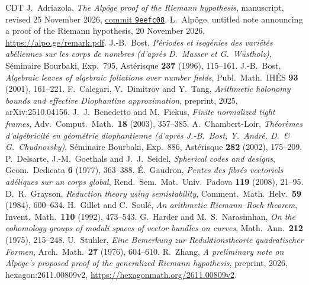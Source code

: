 \documentclass[reqno]{amsart}
\theoremstyle{definition}
\theoremstyle{plain}
\begin{document}
\begin{thebibliography}{CDT}
 J.~Adriazola, \emph{The Alp\"oge proof of the Riemann hypothesis}, manuscript, revised 25 November 2026, \href{https://github.com/jimjamzola/RH-Alpoge-Reconstruction/tree/9eefc08b0819728d4dd2ef0568b49a61251af111}{commit \texttt{9eefc08}}.
 L.~Alp\"oge, untitled note announcing a proof of the Riemann hypothesis, 20 November 2026, \url{https://alpo.ge/remark.pdf}.
 J.-B.~Bost, \emph{P\'eriodes et isog\'enies des vari\'et\'es ab\'eliennes sur les corps de nombres (d'apr\`es D.~Masser et G.~W\"ustholz)}, S\'eminaire Bourbaki, Exp.~795, Ast\'erisque \textbf{237} (1996), 115--161.
 J.-B.~Bost, \emph{Algebraic leaves of algebraic foliations over number fields}, Publ.\ Math.\ IH\'ES \textbf{93} (2001), 161--221.
 F.~Calegari, V.~Dimitrov and Y.~Tang, \emph{Arithmetic holonomy bounds and effective Diophantine approximation}, preprint, 2025, arXiv:2510.04156.
 J.~J.~Benedetto and M.~Fickus, \emph{Finite normalized tight frames}, Adv.\ Comput.\ Math.\ \textbf{18} (2003), 357--385.
 A.~Chambert-Loir, \emph{Th\'eor\`emes d'alg\'ebricit\'e en g\'eom\'etrie diophantienne (d'apr\`es J.-B.~Bost, Y.~Andr\'e, D.~\& G.~Chudnovsky)}, S\'eminaire Bourbaki, Exp.~886, Ast\'erisque \textbf{282} (2002), 175--209.
 P.~Delsarte, J.-M.~Goethals and J.~J.~Seidel, \emph{Spherical codes and designs}, Geom.\ Dedicata \textbf{6} (1977), 363--388.
 \'E.~Gaudron, \emph{Pentes des fibr\'es vectoriels ad\'eliques sur un corps global}, Rend.\ Sem.\ Mat.\ Univ.\ Padova \textbf{119} (2008), 21--95.
 D.~R.~Grayson, \emph{Reduction theory using semistability}, Comment.\ Math.\ Helv.\ \textbf{59} (1984), 600--634.
 H.~Gillet and C.~Soul\'e, \emph{An arithmetic Riemann--Roch theorem}, Invent.\ Math.\ \textbf{110} (1992), 473--543.
 G.~Harder and M.~S.~Narasimhan, \emph{On the cohomology groups of moduli spaces of vector bundles on curves}, Math.\ Ann.\ \textbf{212} (1975), 215--248.
 U.~Stuhler, \emph{Eine Bemerkung zur Reduktionstheorie quadratischer Formen}, Arch.\ Math.\ \textbf{27} (1976), 604--610.
 R.~Zhang, \emph{A preliminary note on Alp\"oge's proposed proof of the generalized Riemann hypothesis}, preprint, 2026, hexagon:2611.00809v2, \url{https://hexagonmath.org/2611.00809v2}.
\end{thebibliography}
\end{document}
